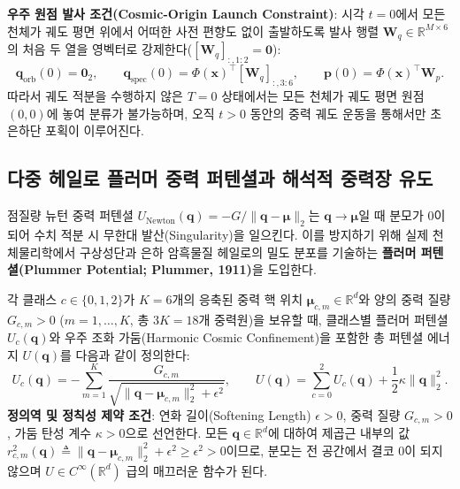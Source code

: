 \documentclass[11pt,a4paper]{article}
\begin{document}
\textbf{우주 원점 발사 조건(Cosmic-Origin Launch Constraint)}: 시각 $t=0$에서 모든 천체가 궤도 평면 위에서 어떠한 사전 편향도 없이 출발하도록 발사 행렬 $\mathbf{W}_q \in \mathbb{R}^{M \times 6}$의 처음 두 열을 영벡터로 강제한다($[\mathbf{W}_q]_{:, 1:2} = \mathbf{0}$):
\begin{equation}
  \mathbf{q}_{\text{orb}}(0) = \mathbf{0}_2, \qquad \mathbf{q}_{\text{spec}}(0) = \Phi(\mathbf{x})^\top [\mathbf{W}_q]_{:, 3:6}, \qquad \mathbf{p}(0) = \Phi(\mathbf{x})^\top \mathbf{W}_p.
\end{equation}
따라서 궤도 적분을 수행하지 않은 $T=0$ 상태에서는 모든 천체가 궤도 평면 원점 $(0,0)$에 놓여 분류가 불가능하며, 오직 $t > 0$ 동안의 중력 궤도 운동을 통해서만 초은하단 포획이 이루어진다.

\subsection{다중 헤일로 플러머 중력 퍼텐셜과 해석적 중력장 유도}

점질량 뉴턴 중력 퍼텐셜 $U_{\text{Newton}}(\mathbf{q}) = -G / \|\mathbf{q} - \boldsymbol{\mu}\|_2$는 $\mathbf{q} \to \boldsymbol{\mu}$일 때 분모가 $0$이 되어 수치 적분 시 무한대 발산(Singularity)을 일으킨다. 이를 방지하기 위해 실제 천체물리학에서 구상성단과 은하 암흑물질 헤일로의 밀도 분포를 기술하는 \textbf{플러머 퍼텐셜(Plummer Potential; Plummer, 1911)}을 도입한다.

각 클래스 $c \in \{0, 1, 2\}$가 $K=6$개의 응축된 중력 핵 위치 $\boldsymbol{\mu}_{c,m} \in \mathbb{R}^d$와 양의 중력 질량 $G_{c,m} > 0$ ($m=1,\dots,K$, 총 $3K=18$개 중력원)을 보유할 때, 클래스별 플러머 퍼텐셜 $U_c(\mathbf{q})$와 우주 조화 가둠(Harmonic Cosmic Confinement)을 포함한 총 퍼텐셜 에너지 $U(\mathbf{q})$를 다음과 같이 정의한다:
\begin{equation}
  U_c(\mathbf{q}) = -\sum_{m=1}^{K} \frac{G_{c,m}}{\sqrt{\|\mathbf{q} - \boldsymbol{\mu}_{c,m}\|_2^2 + \epsilon^2}}, \qquad
  U(\mathbf{q}) = \sum_{c=0}^{2} U_c(\mathbf{q}) + \frac{1}{2}\kappa \|\mathbf{q}\|_2^2.
  \label{eq:plummer_potential}
\end{equation}
\textbf{정의역 및 정칙성 제약 조건}: 연화 길이(Softening Length) $\epsilon > 0$, 중력 질량 $G_{c,m} > 0$, 가둠 탄성 계수 $\kappa > 0$으로 선언한다. 모든 $\mathbf{q} \in \mathbb{R}^d$에 대하여 제곱근 내부의 값 $r_{c,m}^2(\mathbf{q}) \triangleq \|\mathbf{q} - \boldsymbol{\mu}_{c,m}\|_2^2 + \epsilon^2 \ge \epsilon^2 > 0$이므로, 분모는 전 공간에서 결코 $0$이 되지 않으며 $U \in C^\infty(\mathbb{R}^d)$ 급의 매끄러운 함수가 된다.
\end{document}
